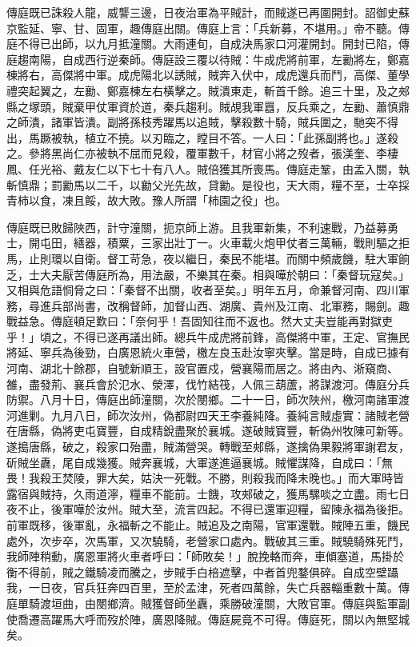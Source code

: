 \begin{pinyinscope}
傳庭既已誅殺人龍，威讋三邊，日夜治軍為平賊計，而賊遂已再圍開封。詔御史蘇京監延、寧、甘、固軍，趣傳庭出關。傳庭上言：「兵新募，不堪用。」帝不聽。傳庭不得已出師，以九月抵潼關。大雨連旬，自成決馬家口河灌開封。開封已陷，傳庭趨南陽，自成西行逆秦師。傳庭設三覆以待賊：牛成虎將前軍，左勷將左，鄭嘉棟將右，高傑將中軍。成虎陽北以誘賊，賊奔入伏中，成虎還兵而鬥，高傑、董學禮突起翼之，左勷、鄭嘉棟左右橫擊之。賊潰東走，斬首千餘。追三十里，及之郟縣之塚頭，賊棄甲仗軍資於道，秦兵趨利。賊覘我軍囂，反兵乘之，左勷、蕭慎鼎之師潰，諸軍皆潰。副將孫枝秀躍馬以追賊，擊殺數十騎，賊兵圍之，馳突不得出，馬蹶被執，植立不撓。以刃臨之，瞠目不答。一人曰：「此孫副將也。」遂殺之。參將黑尚仁亦被執不屈而見殺，覆軍數千，材官小將之歿者，張渼奎、李棲鳳、任光裕、戴友仁以下七十有八人。賊倍獲其所喪馬。傳庭走鞏，由孟入關，執斬慎鼎；罰勷馬以二千，以勷父光先故，貸勷。是役也，天大雨，糧不至，士卒採青柿以食，凍且餒，故大敗。豫人所謂「柿園之役」也。

傳庭既已敗歸陜西，計守潼關，扼京師上游。且我軍新集，不利速戰，乃益募勇士，開屯田，繕器，積粟，三家出壯丁一。火車載火炮甲仗者三萬輛，戰則驅之拒馬，止則環以自衛。督工苛急，夜以繼日，秦民不能堪。而關中頻歲饑，駐大軍餉乏，士大夫厭苦傳庭所為，用法嚴，不樂其在秦。相與嘩於朝曰：「秦督玩寇矣。」又相與危語恫脅之曰：「秦督不出關，收者至矣。」明年五月，命兼督河南、四川軍務，尋進兵部尚書，改稱督師，加督山西、湖廣、貴州及江南、北軍務，賜劍。趣戰益急。傳庭頓足歎曰：「奈何乎！吾固知往而不返也。然大丈夫豈能再對獄吏乎！」頃之，不得已遂再議出師。總兵牛成虎將前鋒，高傑將中軍，王定、官撫民將延、寧兵為後勁，白廣恩統火車營，檄左良玉赴汝寧夾擊。當是時，自成已據有河南、湖北十餘郡，自號新順王，設官置戍，營襄陽而居之。將由內、淅窺商、雒，盡發荊、襄兵會於氾水、滎澤，伐竹結筏，人佩三葫蘆，將謀渡河。傳庭分兵防禦。八月十日，傳庭出師潼關，次於閿鄉。二十一日，師次陜州，檄河南諸軍渡河進剿。九月八日，師次汝州，偽都尉四天王李養純降。養純言賊虛實：諸賊老營在唐縣，偽將吏屯寶豐，自成精銳盡聚於襄城。遂破賊寶豐，斬偽州牧陳可新等。遂搗唐縣，破之，殺家口殆盡，賊滿營哭。轉戰至郟縣，遂擒偽果毅將軍謝君友，斫賊坐纛，尾自成幾獲。賊奔襄城，大軍遂進逼襄城。賊懼謀降，自成曰：「無畏！我殺王焚陵，罪大矣，姑決一死戰。不勝，則殺我而降未晚也。」而大軍時皆露宿與賊持，久雨道濘，糧車不能前。士饑，攻郟破之，獲馬騾啖之立盡。雨七日夜不止，後軍嘩於汝州。賊大至，流言四起。不得已還軍迎糧，留陳永福為後拒。前軍既移，後軍亂，永福斬之不能止。賊追及之南陽，官軍還戰。賊陣五重，饑民處外，次步卒，次馬軍，又次驍騎，老營家口處內。戰破其三重。賊驍騎殊死鬥，我師陣稍動，廣恩軍將火車者呼曰：「師敗矣！」脫挽輅而奔，車傾塞道，馬掛於衡不得前，賊之鐵騎凌而騰之，步賊手白棓遮擊，中者首兜鍪俱碎。自成空壁躡我，一日夜，官兵狂奔四百里，至於孟津，死者四萬餘，失亡兵器輜重數十萬。傳庭單騎渡垣曲，由閿鄉濟。賊獲督師坐纛，乘勝破潼關，大敗官軍。傳庭與監軍副使喬遷高躍馬大呼而歿於陣，廣恩降賊。傳庭屍竟不可得。傳庭死，關以內無堅城矣。


\end{pinyinscope}
